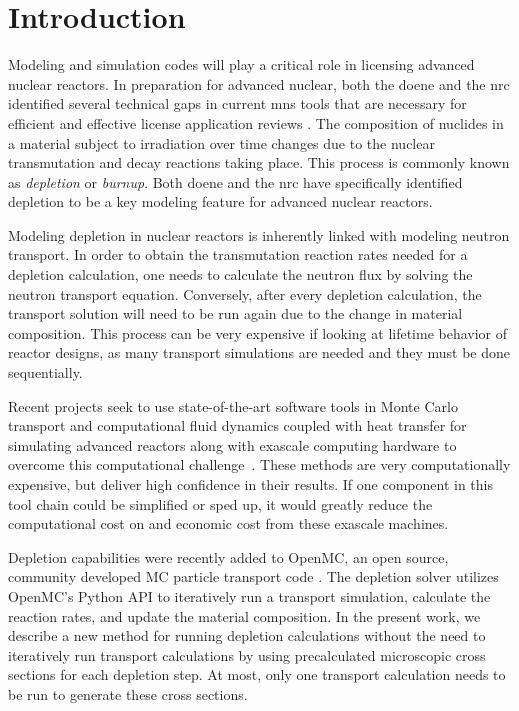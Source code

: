 \section{Introduction}\label{}
    Modeling and simulation codes will play a critical role in licensing
    advanced nuclear reactors. In preparation for advanced nuclear, both the
    \Gls{doene} and the \Gls{nrc} identified several technical gaps in current
    \Gls{mns} tools that are necessary for efficient and effective license
    application reviews \citep{betzler_modeling_2019, usnrc_nonlwr_2020-1}.
    The composition of nuclides in a material subject to irradiation over time
    changes due to the nuclear transmutation and decay reactions taking place.
    This process is commonly known as {\it depletion} or {\it burnup}.  Both
    \Gls{doene} and the \Gls{nrc} have specifically identified depletion to be a
    key modeling feature for advanced nuclear reactors.

    Modeling depletion in nuclear reactors is inherently linked with modeling
    neutron transport. In order to obtain the transmutation reaction rates
    needed for a depletion calculation, one needs to calculate the neutron flux
    by solving the neutron transport equation. Conversely, after every depletion
    calculation, the transport solution will need  to be run again due to the
    change in material composition. This process can be very expensive if
    looking at lifetime behavior of reactor designs, as many transport
    simulations are needed and they must be done sequentially.

    Recent projects seek to use state-of-the-art software tools in Monte Carlo
    transport and computational fluid dynamics coupled with heat transfer for
    simulating advanced reactors along with exascale computing hardware to
    overcome this computational challenge~\citep{romano2021nse,merzari2023sc}.
    These methods are very computationally expensive, but deliver high
    confidence in their results. If one component in this tool chain could be
    simplified or sped up, it would greatly reduce the computational cost on and
    economic cost from these exascale machines.

    Depletion capabilities were recently added to OpenMC, an open source,
    community developed MC particle transport code \citep{romano_openmc_2015,
    romano_depletion_2021}. The depletion solver utilizes OpenMC's Python API to
    iteratively run a transport simulation, calculate the reaction rates, and
    update the material composition. In the present work, we describe a new
    method for running depletion calculations without the need to iteratively
    run transport calculations by using precalculated microscopic cross sections
    for each depletion step. At most, only one transport calculation needs to be
    run to generate these cross sections.

